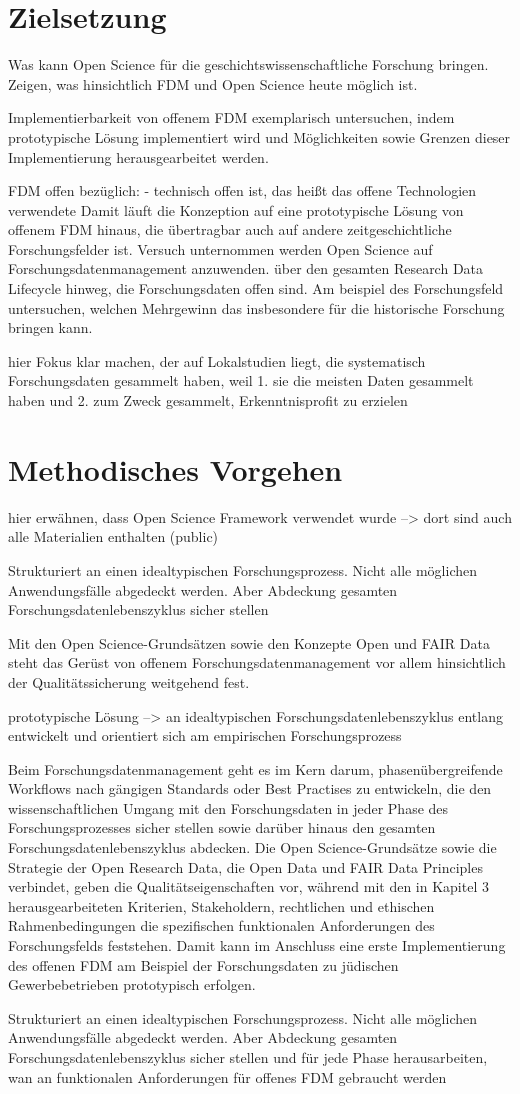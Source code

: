 \section{Zielsetzung}

Was kann Open Science für die geschichtswissenschaftliche Forschung bringen. 
Zeigen, was hinsichtlich FDM und Open Science heute möglich ist.

Implementierbarkeit von offenem FDM exemplarisch untersuchen, indem prototypische Lösung implementiert wird und Möglichkeiten sowie Grenzen dieser Implementierung herausgearbeitet werden.   

FDM offen bezüglich:
- technisch offen ist, das heißt das offene Technologien verwendete
Damit läuft die Konzeption auf eine prototypische Lösung von offenem FDM hinaus, die übertragbar auch auf andere zeitgeschichtliche Forschungsfelder ist.
Versuch unternommen werden Open Science auf Forschungsdatenmanagement anzuwenden. über den gesamten Research Data Lifecycle hinweg, die Forschungsdaten offen sind. Am beispiel des Forschungsfeld untersuchen, welchen Mehrgewinn das insbesondere für die historische Forschung bringen kann. 

 hier Fokus klar machen, der auf Lokalstudien liegt, die systematisch Forschungsdaten gesammelt haben, weil 1. sie die meisten Daten gesammelt haben und 2. zum Zweck gesammelt, Erkenntnisprofit zu erzielen

\section{Methodisches Vorgehen}

hier erwähnen, dass Open Science Framework verwendet wurde --> dort sind auch alle Materialien enthalten (public)

Strukturiert an einen idealtypischen Forschungsprozess. Nicht alle möglichen Anwendungsfälle abgedeckt werden. Aber Abdeckung gesamten Forschungsdatenlebenszyklus sicher stellen

Mit den Open Science-Grundsätzen sowie den Konzepte Open und FAIR Data steht das Gerüst von offenem Forschungsdatenmanagement vor allem hinsichtlich der Qualitätssicherung weitgehend fest.

prototypische Lösung --> an idealtypischen Forschungsdatenlebenszyklus entlang entwickelt und orientiert sich am empirischen Forschungsprozess

Beim Forschungsdatenmanagement geht es im Kern darum, phasenübergreifende Workflows nach gängigen Standards oder Best Practises zu entwickeln, die den wissenschaftlichen Umgang mit den Forschungsdaten in jeder Phase des Forschungsprozesses sicher stellen sowie darüber hinaus den gesamten Forschungsdatenlebenszyklus abdecken. Die Open Science-Grundsätze sowie die Strategie der Open Research Data, die Open Data und FAIR Data Principles verbindet, geben die Qualitätseigenschaften vor, während mit den in Kapitel 3 herausgearbeiteten Kriterien, Stakeholdern, rechtlichen und ethischen Rahmenbedingungen die spezifischen funktionalen Anforderungen des Forschungsfelds feststehen. Damit kann im Anschluss eine erste Implementierung des offenen FDM am Beispiel der Forschungsdaten zu jüdischen Gewerbebetrieben prototypisch erfolgen.

Strukturiert an einen idealtypischen Forschungsprozess. Nicht alle möglichen Anwendungsfälle abgedeckt werden. Aber Abdeckung gesamten Forschungsdatenlebenszyklus sicher stellen und für jede Phase herausarbeiten, wan an funktionalen Anforderungen für offenes FDM gebraucht werden